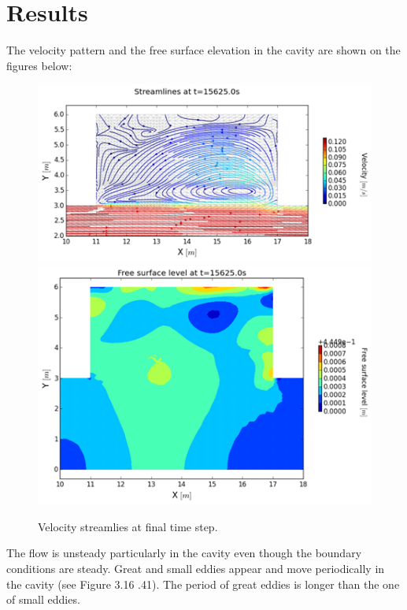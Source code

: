\section{Results}
The velocity pattern and the free surface elevation in the cavity are shown on the figures below:
\begin{figure}
 \centering
 \includegraphics{img/image126}
 \includegraphics{img/image127}
  \caption{Velocity streamlies at final time step.}\label{fig:cavity:vel_tf}
\end{figure}


The flow is unsteady particularly in the cavity even though the boundary
conditions are steady. Great and small eddies appear and move periodically in
the cavity (see Figure  3.16 .41). The period of great eddies is longer than
the one of small eddies.

